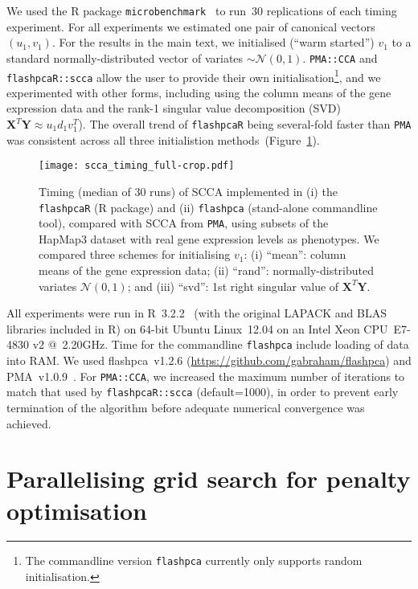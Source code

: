 \documentclass[a4paper,10pt]{article}
\begin{document}
We used the \textsf{R} package \texttt{microbenchmark}~\citep{Mersmann2015}
to run~30 replications of each timing experiment.  For all
experiments we estimated one pair of canonical vectors $(u_1,
v_1)$.  For the results in the main text, we initialised (``warm
started'') $v_1$ to a standard normally-distributed vector of variates
$\sim\mathcal{N}(0,1)$. \texttt{PMA::CCA} and \texttt{flashpcaR::scca}
allow the user to provide their own initialisation\footnote{The commandline
version \texttt{flashpca} currently only supports random initialisation.},
and we experimented with other forms, including using the column means
of the gene expression data and the rank-1 singular value decomposition
(SVD) $\mathbf{X}^T \mathbf{Y} \approx u_1 d_1 v_1^T$). The overall trend of
\texttt{flashpcaR} being several-fold faster than \texttt{PMA} was consistent
across all three initialistion methods~(Figure~\ref{fig:s01}).

\begin{figure}[!tpb]
\centering
\texttt{[image: scca\_timing\_full-crop.pdf]}
\caption{
Timing (median of 30 runs) of SCCA implemented in (i) the \texttt{flashpcaR}
(\textsf{R} package) and (ii) \texttt{flashpca} (stand-alone commandline tool),
compared with SCCA from \texttt{PMA}, using subsets of the HapMap3 dataset with real
gene expression levels as phenotypes. We compared three schemes for initialising
$v_1$: (i) ``mean'': column means of the gene expression data; (ii) ``rand'':
normally-distributed variates $\mathcal{N}(0, 1)$; and (iii) ``svd'': 1st
right singular value of $\mathbf{X}^T \mathbf{Y}$.
}
\label{fig:s01}
\end{figure}

All experiments were run in \textsf{R}~3.2.2~\citep{R} (with the original
LAPACK and BLAS libraries included in \textsf{R}) on 64-bit Ubuntu Linux~12.04
on an Intel Xeon CPU~E7-4830 v2 @~2.20GHz. Time for the commandline
\texttt{flashpca} include loading of data into RAM. We used flashpca~v1.2.6
(\url{https://github.com/gabraham/flashpca}) and PMA~v1.0.9~\citep{Witten2013}.
For \texttt{PMA::CCA}, we increased the maximum number of iterations to match
that used by \texttt{flashpcaR::scca} (default=1000), in order to prevent
early termination of the algorithm before adequate numerical convergence was
achieved. 

\section{Parallelising grid search for penalty optimisation}
\end{document}
